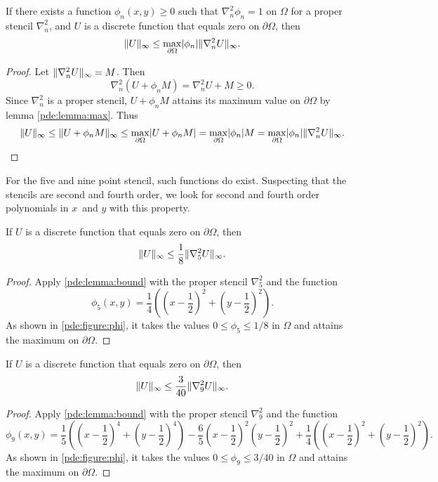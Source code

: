 \begin{lemma}\label{pde:lemma:bound}
  If there exists a function $\phi_n(x,y) \geq 0$ such that $\nabla_n^2 \phi_n = 1$ on $\Omega$ for a proper stencil $\nabla_n^2$, and $U$ is a discrete function that equals zero on $\partial \Omega$, then
  \begin{equation}
    \lVert U \rVert_\infty \leq \max_{\partial\Omega} \lvert \phi_n \rvert
    \lVert \nabla_n^2 U \rVert_\infty.
  \end{equation}
\end{lemma}
\begin{proof}
Let $\lVert \nabla_n^2 U \rVert_\infty = M$.
Then
$$
\nabla_n^2 (U + \phi_n M) = \nabla_n^2 U +  M \geq 0.
$$
Since $\nabla_n^2$ is a proper stencil, $U + \phi_n M$ attains its maximum value on $\partial \Omega$ by lemma \ref{pde:lemma:max}.
Thus
\begin{equation*}
\lVert U \rVert_\infty
\leq \lVert U + \phi_n M \rVert_\infty
\leq \max_{\partial \Omega} \lvert U + \phi_n M\rvert
= \max_{\partial\Omega} \lvert \phi_n \rvert M
= \max_{\partial\Omega} \lvert \phi_n \rvert \lVert \nabla_n^2 U \rVert_\infty. \qedhere
\end{equation*}
\end{proof}

For the five and nine point stencil, such functions do exist.
Suspecting that the stencils are second and fourth order, we look for second and fourth order polynomials in $x$ and $y$ with this property.
\begin{lemma}\label{pde:lemma:bound5}
If $U$ is a discrete function that equals zero on $\partial \Omega$, then
$$ \lVert U \rVert_\infty \leq \frac18 \lVert \nabla_5^2 U \rVert_\infty.$$
\end{lemma}
\begin{proof}
Apply \cref{pde:lemma:bound} with the proper stencil $\nabla_5^2$ and the function
$$
\phi_5(x,y) = \frac14 \left(\left(x-\frac12\right)^2 + \left(y-\frac12\right)^2\right).
$$
As shown in \cref{pde:figure:phi}, it takes the values $0 \leq \phi_5 \leq 1/8$ in $\Omega$ and attains the maximum on $\partial \Omega$.
\end{proof}
\newcommand{\phinine}{\frac{1}{5} \left(\left(x-\frac{1}{2}\right)^4+\left(y-\frac{1}{2}\right)^4\right) - \frac{6}{5} \left(x-\frac{1}{2}\right)^2\left(y-\frac{1}{2}\right)^2 + \frac{1}{4} \left(\left(x-\frac{1}{2}\right)^2+\left(y-\frac{1}{2}\right)^2\right)}
\begin{lemma}\label{pde:lemma:bound9}
If $U$ is a discrete function that equals zero on $\partial \Omega$, then
$$ \lVert U \rVert_\infty \leq \frac{3}{40} \lVert \nabla_9^2 U \rVert_\infty.$$
\end{lemma}
\begin{proof}
Apply \cref{pde:lemma:bound} with the proper stencil $\nabla_9^2$ and the function
$$
\phi_9(x,y) = \phinine.
$$
As shown in \cref{pde:figure:phi}, it takes the values $0 \leq \phi_9 \leq 3/40$ in $\Omega$ and attains the maximum on $\partial \Omega$.
\end{proof}


